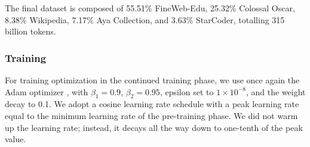 The final dataset is composed of 55.51\% FineWeb-Edu, 25.32\% Colossal Oscar, 8.38\% Wikipedia, 7.17\% Aya Collection, and 3.63\% StarCoder, totalling 315 billion tokens.

\subsubsection{Training}
For training optimization in the continued training phase, we use once again the Adam optimizer \cite{adam_original, adam}, with $\beta_1 = 0.9$, $\beta_2 = 0.95$, epsilon set to $1 \times 10^{-8}$, and the weight decay to 0.1. We adopt a cosine learning rate schedule with a peak learning rate equal to the minimum learning rate of the pre-training phase. We did not warm up the learning rate; instead, it decays all the way down to one-tenth of the peak value.




